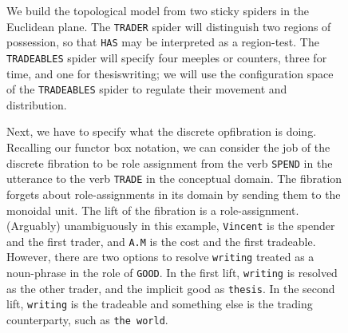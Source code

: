\begin{example}
\begin{figure}[h]
\end{figure}
\begin{figure}[h]\label{fig:topmodel}
\centering
{}
\caption{We build the topological model from two sticky spiders in the Euclidean plane. The \texttt{TRADER} spider will distinguish two regions of possession, so that \texttt{HAS} may be interpreted as a region-test. The \texttt{TRADEABLES} spider will specify four meeples or counters, three for time, and one for thesiswriting; we will use the configuration space of the \texttt{TRADEABLES} spider to regulate their movement and distribution.}
\end{figure}
\begin{figure}\label{fig:fibroles}
\centering
{}
\caption[-10cm]{Next, we have to specify what the discrete opfibration is doing. Recalling our functor box notation, we can consider the job of the discrete fibration to be role assignment from the verb \texttt{SPEND} in the utterance to the verb \texttt{TRADE} in the conceptual domain. The fibration forgets about role-assignments in its domain by sending them to the monoidal unit. The lift of the fibration is a role-assignment. (Arguably) unambiguously in this example, \texttt{Vincent} is the spender and the first trader, and \texttt{A.M} is the cost and the first tradeable. However, there are two options to resolve \texttt{writing} treated as a noun-phrase in the role of \texttt{GOOD}. In the first lift, \texttt{writing} is resolved as the other trader, and the implicit good as \texttt{thesis}. In the second lift, \texttt{writing} is the tradeable and something else is the trading counterparty, such as \texttt{the world}.}

\end{figure}
\end{example}
